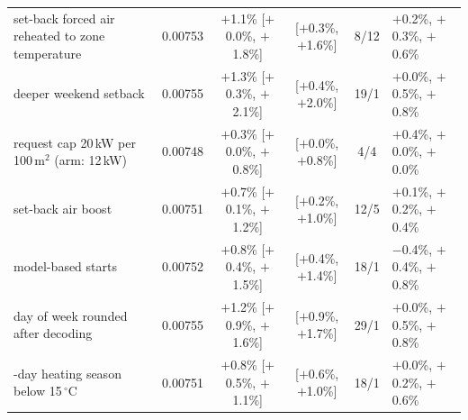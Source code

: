\begin{table}[t]
\begin{tabular}{>{\raggedright\arraybackslash}p{3.8cm}cccc>{\raggedright\arraybackslash}p{2.5cm}}
set-back forced air reheated to zone temperature & 0.00753 & $+$1.1\% [$+$0.0\%, $+$1.8\%] & [$+$0.3\%, $+$1.6\%] & 8/12 & $+$0.2\%, $+$0.3\%, $+$0.6\% \\
deeper weekend setback & 0.00755 & $+$1.3\% [$+$0.3\%, $+$2.1\%] & [$+$0.4\%, $+$2.0\%] & 19/1 & $+$0.0\%, $+$0.5\%, $+$0.8\% \\
request cap 20\,kW per 100\,m$^2$ (arm: 12\,kW) & 0.00748 & $+$0.3\% [$+$0.0\%, $+$0.8\%] & [$+$0.0\%, $+$0.8\%] & 4/4 & $+$0.4\%, $+$0.0\%, $+$0.0\% \\
set-back air boost & 0.00751 & $+$0.7\% [$+$0.1\%, $+$1.2\%] & [$+$0.2\%, $+$1.0\%] & 12/5 & $+$0.1\%, $+$0.2\%, $+$0.4\% \\
model-based starts & 0.00752 & $+$0.8\% [$+$0.4\%, $+$1.5\%] & [$+$0.4\%, $+$1.4\%] & 18/1 & $-$0.4\%, $+$0.4\%, $+$0.8\% \\
day of week rounded after decoding & 0.00755 & $+$1.2\% [$+$0.9\%, $+$1.6\%] & [$+$0.9\%, $+$1.7\%] & 29/1 & $+$0.0\%, $+$0.5\%, $+$0.8\% \\
7-day heating season below 15\,$^\circ$C & 0.00751 & $+$0.8\% [$+$0.5\%, $+$1.1\%] & [$+$0.6\%, $+$1.0\%] & 18/1 & $+$0.0\%, $+$0.2\%, $+$0.6\% \\
\bottomrule
\end{tabular}
\end{table}
